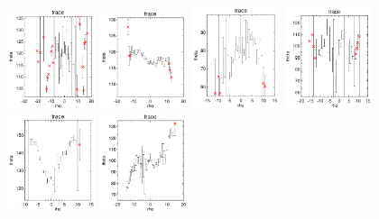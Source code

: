 \documentclass[fleqn,usenatbib]{mnras}
\begin{document}
\begin{figure}
    \centering
    \includegraphics[width=0.23\textwidth]{Images/trace-plots/trace-plots-cpsbs/8938-6102.png}
    \includegraphics[width=0.23\textwidth]{Images/trace-plots/trace-plots-cpsbs/8941-3701.png}
    \includegraphics[width=0.23\textwidth]{Images/trace-plots/trace-plots-cpsbs/8944-1902.png}
    \includegraphics[width=0.23\textwidth]{Images/trace-plots/trace-plots-cpsbs/8950-3704.png}
    \includegraphics[width=0.23\textwidth]{Images/trace-plots/trace-plots-cpsbs/8979-1902.png}
    \includegraphics[width=0.23\textwidth]{Images/trace-plots/trace-plots-cpsbs/8996-3704.png}

\end{figure}
\end{document}
